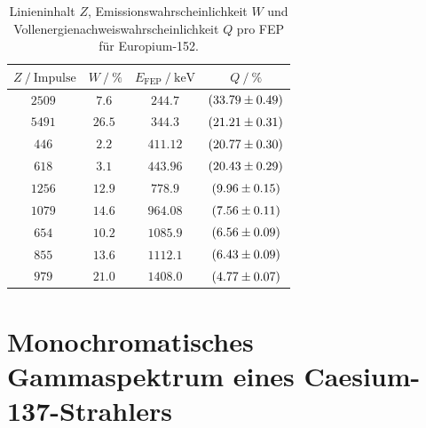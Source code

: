 \begin{table}
    \centering
    \caption{Linieninhalt $Z$, Emissionswahrscheinlichkeit $W$ und Vollenergienachweiswahrscheinlichkeit $Q$ pro FEP für Europium-152.}
    \label{tab:eu152}
    \begin{tabular}{c c c c}
      \toprule
      $Z \mathbin{/} \mathrm{Impulse}$ & $W \mathbin{/} \% $ & $E_{\mathrm{FEP}} \mathbin{/} \unit{\kilo\electronvolt}$ & $Q \mathbin{/} \%$ \\
      \midrule
      $\qty{2509}{} $ & $\qty{7.6}{}$ & $244.7$ & $\qty{33.79 \pm 0.49}{}$ \\
      $\qty{5491}{}$ & $\qty{26.5}{}$ & $344.3$ & $\qty{21.21 \pm 0.31}{}$ \\
      $\qty{446}{}$ & $\qty{2.2}{}$ & $411.12$ & $\qty{20.77 \pm 0.30}{}$ \\
      $\qty{618}{}$ & $\qty{3.1}{}$ & $443.96$ & $\qty{20.43 \pm 0.29}{}$ \\
      $\qty{1256}{}$ & $\qty{12.9}{}$ & $778.9$ & $\qty{9.96 \pm 0.15}{}$ \\
      $\qty{1079}{}$ & $\qty{14.6}{}$ & $964.08$ & $\qty{7.56 \pm 0.11}{}$ \\
      $\qty{654}{}$ & $\qty{10.2}{}$ & $1085.9$ & $\qty{6.56 \pm 0.09}{}$ \\
      $\qty{855}{}$ & $\qty{13.6}{}$ & $1112.1$ & $\qty{6.43 \pm 0.09}{}$ \\
      $\qty{979}{}$ & $\qty{21.0}{}$ & $1408.0$ & $\qty{4.77 \pm 0.07}{}$ \\
      \bottomrule
    \end{tabular}
\end{table}

\section{Monochromatisches Gammaspektrum eines Caesium-137-Strahlers}

